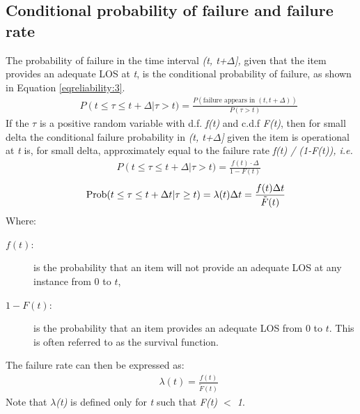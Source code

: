\subsection{Conditional probability of failure and failure rate}
The probability of failure in the time interval \textit{(t, t+$\Delta{}$],}
given that the item provides an adequate LOS at \textit{t}, is the conditional
probability of failure, as shown in Equation \eqref{eqreliability:3}.
\begin{eqnarray}
&& P\left( t \le \tau \le t+\Delta \right|\tau > t) = \frac{P\left( \text{failure appears in } (t,t+\Delta) \right)}{P(\tau >t)}
\label{eqreliability:3}
\end{eqnarray}
If the \textit{$\tau{}$} is a positive random variable with d.f. \textit{f(t)}
and c.d.f \textit{F(t)}, then for small delta the conditional failure probability
in \textit{(t, t+$\Delta{}$]} given the item is operational at \textit{t} is, for
small delta, approximately equal to the failure rate \textit{f(t) / (1-F(t)),
i.e.}
\begin{eqnarray}
&& P\left( t \le \tau \le t+\Delta \right|\tau > t) = \frac{f(t)\cdot \Delta}{1-F(t)}
\label{eqreliability:4}
\end{eqnarray}
\begin{eqnarray}
&& {\rm{Prob}}(t \le \tau  \le t + \Delta t|\tau  \ge t) = \lambda (t)\Delta t =
\frac{{f(t)\Delta t}}{{\tilde F(t)}}
\label{eqreliability:5}
\end{eqnarray}
Where:
\begin{adjustwidth}{1cm}{}
\begin{description}
\item[$f(t)$:] is the probability that an item will not provide an adequate LOS at any instance from 0 to $t$,
\item[$1-F(t)$:] is the probability that an item provides an adequate LOS from 0 to $t$. This is often referred to as the survival function. 
\end{description}
\end{adjustwidth}
The failure rate can then be expressed as:
\begin{eqnarray}
&& \lambda (t) = \frac{{f(t)}}{{\tilde F(t)}}
\end{eqnarray}
Note that \textit{$\lambda{}$(t)} is defined only for \textit{t} such that
\textit{F(t) $<$ 1}.
%
